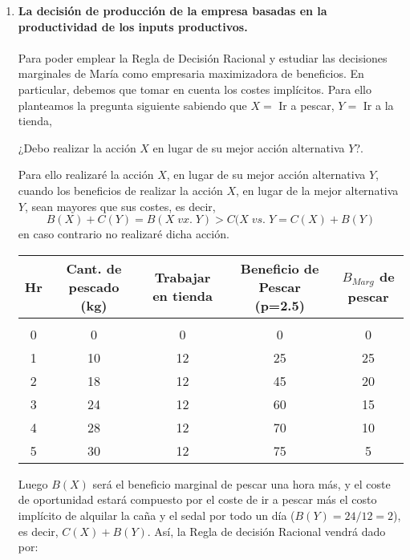 \begin{enumerate}
\begin{enumerate}[\bfseries 2.1]
	    \item \textbf{La decisión de producción de la empresa basadas en la productividad de los inputs productivos.}\\\\
		Para poder emplear la Regla de Decisión Racional y estudiar las decisiones marginales de María como empresaria maximizadora de beneficios. En particular, debemos que tomar en cuenta los costes implícitos. Para ello planteamos la pregunta siguiente sabiendo que $X = $ Ir a pescar, $Y = $ Ir a la tienda,
		\begin{tcolorbox}[colframe=white]
		    \begin{center}
			¿Debo realizar la acción $X$ en lugar de su mejor acción alternativa $Y$?.
		    \end{center}
		\end{tcolorbox}

		Para ello realizaré la acción $X$, en lugar de su mejor acción alternativa $Y$, cuando los beneficios de realizar la acción $X$, en lugar de la mejor alternativa $Y$, sean mayores que sus costes, es decir,
		$$B(X)+C(Y) = B(X \; vx. \; Y) > C(X \; vs. \; Y = C(X)+B(Y)$$
		en caso contrario no realizaré dicha acción.

		\begin{center}
		    \begin{tabular}{ccccc}
			Hr&Cant. de pescado (kg)&Trabajar en tienda&Beneficio de Pescar (p=2.5)&$B_{Marg}$ de pescar&\\
			\hline\\
			     0&0&0&0&0\\
			     1&10&12&25&25\\
			     2&18&12&45&20\\
			     3&24&12&60&15\\
			     4&28&12&70&10\\
			     5&30&12&75&5\\
		    \end{tabular}
		\end{center}
		\vspace{.5cm}

		Luego $B(X)$ será  el beneficio marginal de pescar una hora más, y  el coste de oportunidad estará compuesto por el coste de ir a pescar más el costo implícito de alquilar la caña y el sedal por todo un día ($B(Y) = 24/12 = 2$), es decir, $C(X)+B(Y)$. Así, la Regla de decisión Racional vendrá dado por:\\


\end{enumerate}
\end{enumerate}
